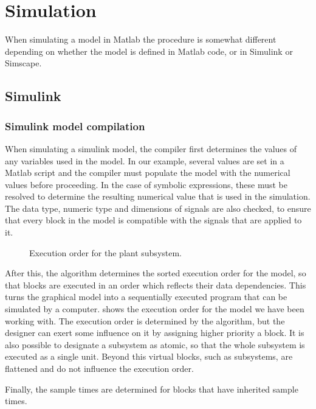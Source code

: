 \documentclass[\rootfolder/main.tex]{subfiles}
\begin{document}
\section{Simulation}

When simulating a model in Matlab the procedure is somewhat different depending on whether the model is defined in Matlab code, or in Simulink or Simscape.

\subsection{Simulink}

\subsubsection{Simulink model compilation}

When simulating a simulink model, the compiler first determines the values of any variables used in the model.
In our example, several values are set in a Matlab script and the compiler must populate the model with the numerical values before proceeding.
In the case of symbolic expressions, these must be resolved to determine the resulting numerical value that is used in the simulation.
The data type, numeric type and dimensions of signals are also checked, to ensure that every block in the model is compatible with the signals that are applied to it.

\begin{figure}[ht]
    \centering
    \tiny
    
    \caption{Execution order for the plant subsystem.\label{fig:inertial-simulink-order}}
\end{figure}

After this, the algorithm determines the sorted execution order for the model, so that blocks are executed in an order which reflects their data dependencies.
This turns the graphical model into a sequentially executed program that can be simulated by a computer.
 shows the execution order for the model we have been working with.
The execution order is determined by the algorithm, but the designer can exert some influence on it by assigning higher priority a block.
It is also possible to designate a subsystem as atomic, so that the whole subsystem is executed as a single unit.
Beyond this virtual blocks, such as subsystems, are flattened and do not influence the execution order.

Finally, the sample times are determined for blocks that have inherited sample times.
\end{document}
